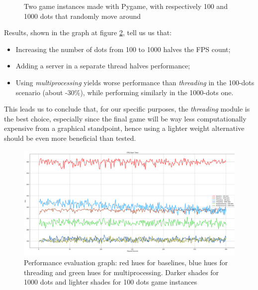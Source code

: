 \begin{figure}[h]
    \caption{Two game instances made with Pygame, with respectively 100 and 1000 dots that randomly move around}
    \label{fig:randomdots}
\end{figure}

Results, shown in the graph at figure \ref{fig:peval}, tell us us that: 

\begin{itemize}
    \item Increasing the number of dots from 100 to 1000 halves the FPS count;
    \item Adding a server in a separate thread halves performance;
    \item Using \textit{multiprocessing} yields worse performance than \textit{threading} in the 100-dots scenario (about -30\%), while performing similarly in the 1000-dots one.
\end{itemize}

This leads us to conclude that, for our specific purposes, the \textit{threading} module is the best choice, especially since the final game will be way less computationally expensive from a graphical standpoint, hence using a lighter weight alternative should be even more beneficial than tested.

\begin{figure}[h]
  \centering
  \includegraphics[width=\linewidth]{images/performance_eval_fps_graph.png}
  \caption{Performance evaluation graph: red hues for baselines, blue hues for threading and green hues for multiprocessing. Darker shades for 1000 dots and lighter shades for 100 dots game instances}
  \label{fig:peval}
\end{figure}

